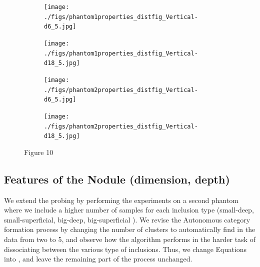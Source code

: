 \documentclass[]{interact}
\theoremstyle{plain}%
\theoremstyle{definition}
\theoremstyle{remark}
\begin{document}
\begin{figure}[]
	\centering
	\begin{subfigure}[b]{.48\textwidth}
		\texttt{[image: ./figs/phantom1properties\_distfig\_Vertical-d6\_5.jpg]}
		\caption{}
		\label{cluster_distance:ph1-1}
	\end{subfigure}
	\begin{subfigure}[b]{.48\textwidth}
		\texttt{[image: ./figs/phantom1properties\_distfig\_Vertical-d18\_5.jpg]}
		\caption{}
		\label{cluster_distance:ph1-2}
	\end{subfigure}
	\begin{subfigure}[b]{.48\textwidth}
		\texttt{[image: ./figs/phantom2properties\_distfig\_Vertical-d6\_5.jpg]}
		\caption{}
		\label{cluster_distance:ph2-1}
	\end{subfigure}
	\begin{subfigure}[b]{.48\textwidth}
		\texttt{[image: ./figs/phantom2properties\_distfig\_Vertical-d18\_5.jpg]}
		\caption{}
		\label{cluster_distance:ph2-2}
	\end{subfigure}
	\caption{Figure 10}
	\label{cluster_distance}
\end{figure}
 
 
 
 
\subsection{Features of the Nodule (dimension, depth)}

We extend the probing by performing the experiments on a second phantom where we include a higher number of samples for each inclusion type (small-deep, small-superficial, big-deep, big-superficial ). We revise the Autonomous category formation process by changing the number of clusters to automatically find in the data from two to 5, and observe how the algorithm performs in the harder task of dissociating between the various type of inclusions. Thus, we change Equations  into , and leave the remaining part of the process unchanged. 
\end{document}
